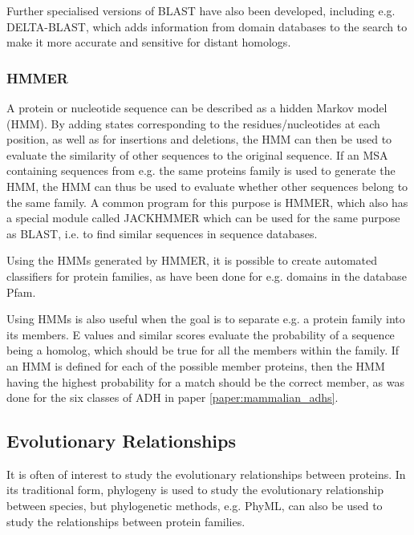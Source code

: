 \documentclass[a4paper, twoside, 12pt, openright]{report}
\begin{document}
Further specialised versions of BLAST have also been developed, including e.g. DELTA-BLAST\cite{boratyn_domain_2012}, which adds information from domain databases to the search to make it more accurate and sensitive for distant homologs.


\subsubsection{HMMER}
\label{sec:hmmer}

A protein or nucleotide sequence can be described as a hidden Markov model (HMM).   By adding states corresponding to the residues/nucleotides at each position, as well as for insertions and deletions, the HMM can then be used to evaluate the similarity of other sequences to the original sequence. If an MSA containing sequences from e.g. the same proteins family is used to generate the HMM, the HMM can thus be used to evaluate whether other sequences belong to the same family. A common program for this purpose is HMMER\cite{eddy_accelerated_2011}, which also has a special module called JACKHMMER which can be used for the same purpose as BLAST, i.e. to find similar sequences in sequence databases.

Using the HMMs generated by HMMER, it is possible to create automated classifiers for protein families, as have been done for e.g. domains in the database Pfam\cite{finn_pfam:_2014}. 

Using HMMs is also useful when the goal is to separate e.g. a protein family into its members. E values and similar scores evaluate the probability of a sequence being a homolog, which should be true for all the members within the family. If an HMM is defined for each of the possible member proteins, then the HMM having the highest probability for a match should be the correct member, as was done for the six classes of ADH in paper \ref{paper:mammalian_adhs}.


\subsection{Evolutionary Relationships}
\label{sec:evolutionary_rel}

It is often of interest to study the evolutionary relationships between proteins. In its traditional form, phylogeny is used to study the evolutionary relationship between species, but phylogenetic methods, e.g. PhyML\cite{guindon_new_2010}, can also be used to study the relationships between protein families.
\end{document}
